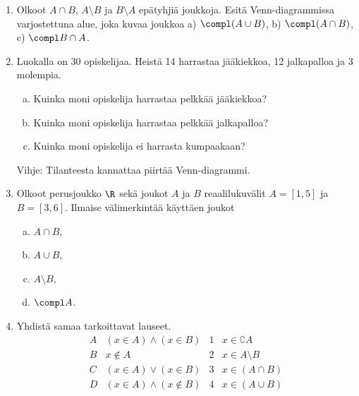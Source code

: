 \begin{enumerate}
\begin{center}



\end{center}

\item
Olkoot $A \cap B$, $A \setminus B$ ja $B \setminus A$ epätyhjiä joukkoja. Esitä Venn-diagrammissa varjostettuna alue, joka kuvaa joukkoa a) $\compl (A \cup B)$, b) $\compl (A \cap B)$, c) $\compl B \cap A$.

\item Luokalla on 30 opiskelijaa. Heistä 14 harrastaa jääkiekkoa, 12 jalkapalloa ja 3 molempia. 
\begin{enumerate}[a)]
\item Kuinka moni opiskelija harrastaa pelkkää jääkiekkoa?
\item Kuinka moni opiskelija harrastaa pelkkää jalkapalloa?
\item Kuinka moni opiskelija ei harrasta kumpaakaan?
\end{enumerate}
Vihje: Tilanteesta kannattaa piirtää Venn-diagrammi.

\item Olkoot perusjoukko $\R$ sekä joukot $A$ ja $B$ reaalilukuvälit $A=[1, 5]$ ja $B=[3, 6]$. Ilmaise välimerkintää käyttäen joukot
\begin{enumerate}[a)]
\item $A \cap B$,
\item $A \cup B$,
\item $A \setminus B$,
\item $\compl A$.
\end{enumerate}

\item Yhdistä samaa tarkoittavat lauseet.
\[
\begin{array}{llll}
A & (x\in A)\land (x\in B) & 1 & x\in \complement A \\
B & x\notin A & 2 & x \in A\setminus B \\
C & (x\in A)\lor (x\in B) & 3 & x\in (A\cap B) \\
D & (x\in A)\land (x\notin B) & 4 & x\in (A\cup B)
\end{array}
\]


\end{enumerate}
